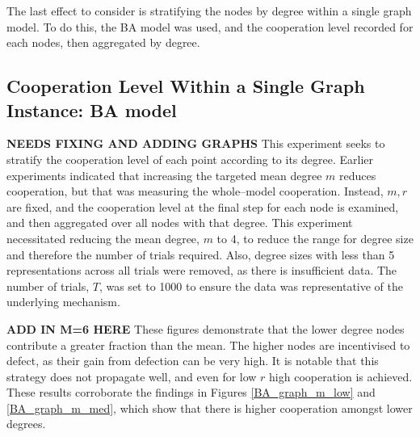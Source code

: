 The last effect to consider is stratifying the nodes by degree within a single graph model. To do this, the BA model was used, and the cooperation level recorded for each nodes, then aggregated by degree. \\

\subsection{Cooperation Level Within a Single Graph Instance: BA model } \textbf{NEEDS FIXING AND ADDING GRAPHS}
This experiment seeks to stratify the cooperation level of each point according to its degree. Earlier experiments indicated that increasing the targeted mean degree $m$ reduces cooperation, but that was measuring the whole--model cooperation. Instead, $m, r$ are fixed, and the cooperation level at the final step for each node is examined, and then aggregated over all nodes with that degree. This experiment necessitated reducing the mean degree, $m$ to 4, to reduce the range for degree size and therefore the number of trials required. Also, degree sizes with less than 5 representations across all trials were removed, as there is insufficient data. The number of trials, $T$, was set to 1000 to ensure the data was representative of the underlying mechanism. \\
\FloatBarrier
\FloatBarrier

\FloatBarrier
\FloatBarrier

\textbf{ADD IN M=6 HERE}
These figures demonstrate that the lower degree nodes contribute a greater fraction than the mean. The higher nodes are incentivised to defect, as their gain from defection can be very high. It is notable that this strategy does not propagate well, and even for low $r$ high cooperation is achieved. These results corroborate the findings in Figures \ref{BA_graph_m_low} and \ref{BA_graph_m_med}, which show that there is higher cooperation amongst lower degrees. \\

